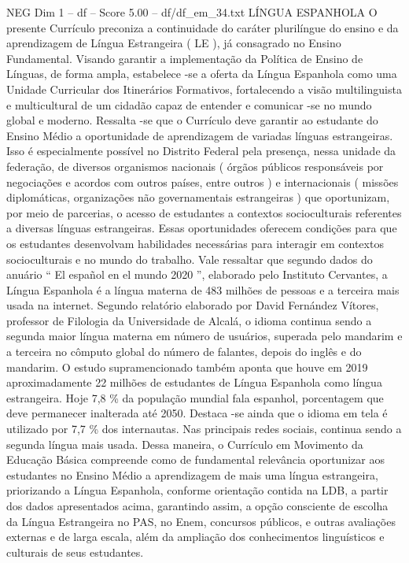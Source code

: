 \begin{textsample}{NEG Dim 1 – df – Score 5.00 – df/df\_em\_34.txt}  \label{ex:f1_neg_165}
LÍNGUA ESPANHOLA O presente Currículo preconiza a continuidade do caráter plurilíngue do ensino e da aprendizagem de Língua Estrangeira ( LE ), já consagrado no Ensino Fundamental.
Visando garantir a implementação da Política de Ensino de Línguas, de forma ampla, estabelece -se a oferta da Língua Espanhola como uma Unidade Curricular dos Itinerários Formativos, fortalecendo a visão multilinguista e multicultural de um cidadão capaz de entender e comunicar -se no mundo global e moderno.
Ressalta -se que o Currículo deve garantir ao estudante do Ensino Médio a oportunidade de aprendizagem de variadas línguas estrangeiras.
Isso é especialmente possível no Distrito Federal pela presença, nessa unidade da federação, de diversos organismos nacionais ( órgãos públicos responsáveis por negociações e acordos com outros países, entre outros ) e internacionais ( missões diplomáticas, organizações não governamentais estrangeiras ) que oportunizam, por meio de parcerias, o acesso de estudantes a contextos socioculturais referentes a diversas línguas estrangeiras.
Essas oportunidades oferecem condições para que os estudantes desenvolvam habilidades necessárias para interagir em contextos socioculturais e no mundo do trabalho.
Vale ressaltar que segundo dados do anuário “ El español en el mundo 2020 ”, elaborado pelo Instituto Cervantes, a Língua Espanhola é a língua materna de 483 milhões de pessoas e a terceira mais usada na internet.
Segundo relatório elaborado por David Fernández Vítores, professor de Filologia da Universidade de Alcalá, o idioma continua sendo a segunda maior língua materna em número de usuários, superada pelo mandarim e a terceira no cômputo global do número de falantes, depois do inglês e do mandarim.
O estudo supramencionado também aponta que houve em 2019 aproximadamente 22 milhões de estudantes de Língua Espanhola como língua estrangeira.
Hoje 7,8 \% da população mundial fala espanhol, porcentagem que deve permanecer inalterada até 2050.
Destaca -se ainda que o idioma em tela é utilizado por 7,7 \% dos internautas.
Nas principais redes sociais, continua sendo a segunda língua mais usada.
Dessa maneira, o Currículo em Movimento da Educação Básica compreende como de fundamental relevância oportunizar aos estudantes no Ensino Médio a aprendizagem de mais uma língua estrangeira, priorizando a Língua Espanhola, conforme orientação contida na LDB, a partir dos dados apresentados acima, garantindo assim, a opção consciente de escolha da Língua Estrangeira no PAS, no Enem, concursos públicos, e outras avaliações externas e de larga escala, além da ampliação dos conhecimentos linguísticos e culturais de seus estudantes.

\end{textsample}
